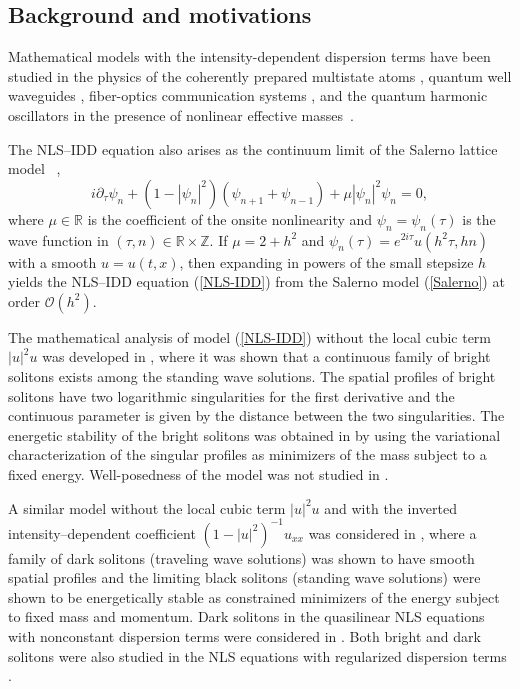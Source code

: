 \documentclass[12pt,reqno]{amsart}
\newcommand{\R}{{\mathbb R}}
\numberwithin{equation}{section}
\numberwithin{figure}{section}
\begin{document}
 
	 
\subsection{Background and motivations}

Mathematical models with the intensity-dependent dispersion terms have been studied in the physics of the coherently prepared multistate atoms \cite{greentree}, quantum well waveguides \cite{koser}, fiber-optics communication systems \cite{OL2020}, and the quantum harmonic oscillators in the presence of
nonlinear effective masses~\cite{chang}. 

The NLS--IDD equation also arises as the continuum limit of the Salerno lattice model ~\cite{salerno}, 
\begin{equation}
i \partial_{\tau} \psi_n + (1-|\psi_n|^2) (\psi_{n+1} + \psi_{n-1}) + \mu |\psi_n|^2 \psi_n = 0,
\label{Salerno}
\end{equation}
where $\mu \in \R$ is the coefficient of the onsite nonlinearity 
and $\psi_n = \psi_n(\tau)$ is the wave function in $(\tau,n) \in \R \times \mathbb{Z}$. 
If $\mu = 2 + h^2$ and $\psi_n(\tau) = e^{2i \tau} u(h^2 \tau, hn)$ with a smooth $u = u(t,x)$, then expanding in powers of the small stepsize $h$ yields the NLS--IDD equation (\ref{NLS-IDD}) from the Salerno model (\ref{Salerno}) at order $\mathcal{O}(h^2)$.

The mathematical analysis of model (\ref{NLS-IDD}) 
without the local cubic term $|u|^2 u$ was developed in 
\cite{RKP}, where it was shown that a continuous family of bright solitons exists among the standing wave solutions. The spatial profiles of bright solitons have two logarithmic singularities for the first derivative and the continuous parameter is given by the distance between the two singularities. The energetic stability of the bright solitons was obtained in \cite{PRK} by using the variational characterization of the singular profiles as minimizers of the mass subject to a fixed energy. Well-posedness of the model was not studied in \cite{PRK,RKP}. 

A similar model without the local cubic term $|u|^2 u$ and with the inverted 
intensity--dependent coefficient $(1-|u|^2)^{-1} u_{xx}$ was considered in \cite{PP24}, where a family of dark solitons (traveling wave solutions) was shown to have smooth spatial profiles and the limiting black solitons (standing wave solutions) were shown to be energetically stable as constrained minimizers 
of the energy subject to fixed mass and momentum. Dark solitons in the quasilinear NLS equations with nonconstant dispersion terms were considered in \cite{Laire1,Laire2,Laire3}. Both bright and dark solitons were also studied in the NLS equations with regularized dispersion terms \cite{Albert,Sparber,Plum}.
\end{document}
